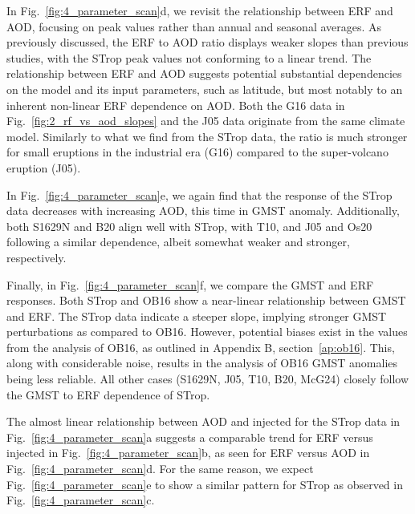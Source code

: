 \documentclass[draft]{agujournal2019}
\begin{document}
  In Fig.~\ref{fig:4_parameter_scan}d, we revisit the relationship between ERF and AOD,
  focusing on peak values rather than annual and seasonal averages. As previously
  discussed, the ERF to AOD ratio displays weaker slopes than previous studies, with the
  STrop peak values not conforming to a linear trend. The relationship between ERF and
  AOD suggests potential substantial dependencies on the model and its input parameters,
  such as latitude, but most notably to an inherent non-linear ERF dependence on AOD.
  Both the G16 data in Fig.~\ref{fig:2_rf_vs_aod_slopes} and the J05 data originate from
  the same climate model. Similarly to what we find from the STrop data, the ratio is
  much stronger for small eruptions in the industrial era (G16) compared to the
  super-volcano eruption (J05).

  In Fig.~\ref{fig:4_parameter_scan}e, we again find that the response of the STrop data
  decreases with increasing AOD, this time in GMST anomaly. Additionally, both S1629N
  and B20 align well with STrop, with T10, and J05 and Os20 following a similar
  dependence, albeit somewhat weaker and stronger, respectively.

  Finally, in Fig.~\ref{fig:4_parameter_scan}f, we compare the GMST and ERF responses.
  Both STrop and OB16 show a near-linear relationship between GMST and ERF. The STrop
  data indicate a steeper slope, implying stronger GMST perturbations as compared to
  OB16. However, potential biases exist in the values from the analysis of OB16, as
  outlined in Appendix B, section~\ref{ap:ob16}. This, along with considerable noise,
  results in the analysis of OB16 GMST anomalies being less reliable. All other cases
  (S1629N, J05, T10, B20, McG24) closely follow the GMST to ERF dependence of STrop.

  The almost linear relationship between AOD and injected  for the STrop data in
  Fig.~\ref{fig:4_parameter_scan}a suggests a comparable trend for ERF versus injected
   in Fig.~\ref{fig:4_parameter_scan}b, as seen for ERF versus AOD in
  Fig.~\ref{fig:4_parameter_scan}d. For the same reason, we expect
  Fig.~\ref{fig:4_parameter_scan}e to show a similar pattern for STrop as observed in
  Fig.~\ref{fig:4_parameter_scan}c.
\end{document}
